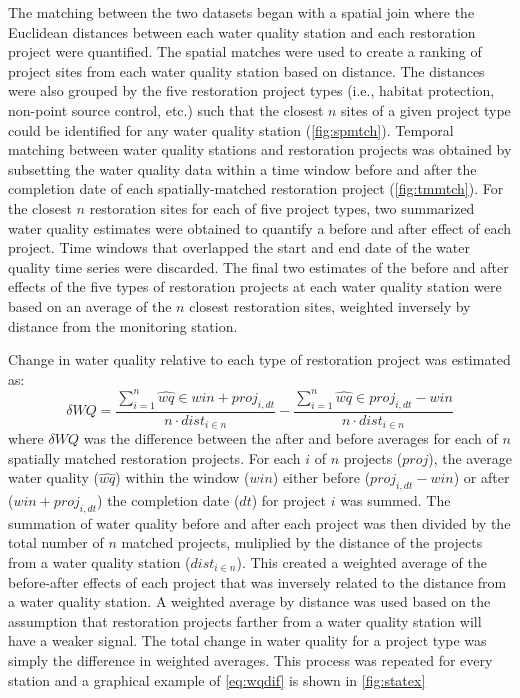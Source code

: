 \documentclass[]{article}
\begin{document}
The matching between the two datasets began with a spatial join where
the Euclidean distances between each water quality station and each
restoration project were quantified. The spatial matches were used to
create a ranking of project sites from each water quality station based
on distance. The distances were also grouped by the five restoration
project types (i.e., habitat protection, non-point source control, etc.)
such that the closest \(n\) sites of a given project type could be
identified for any water quality station (\cref{fig:spmtch}). Temporal
matching between water quality stations and restoration projects was
obtained by subsetting the water quality data within a time window
before and after the completion date of each spatially-matched
restoration project (\cref{fig:tmmtch}). For the closest \(n\)
restoration sites for each of five project types, two summarized water
quality estimates were obtained to quantify a before and after effect of
each project. Time windows that overlapped the start and end date of the
water quality time series were discarded. The final two estimates of the
before and after effects of the five types of restoration projects at
each water quality station were based on an average of the \(n\) closest
restoration sites, weighted inversely by distance from the monitoring
station.

Change in water quality relative to each type of restoration project was
estimated as: \begin{equation}
\delta WQ = \frac{\sum_{i = 1}^{n} \hat{wq} \in win + proj_{i, dt}}{n \cdot dist_{i \in n}} - \frac{\sum_{i = 1}^{n} \hat{wq} \in proj_{i, dt} - win}{n \cdot dist_{i \in n}}
\label{eq:wqdif}
\end{equation} where \(\delta WQ\) was the difference between the after
and before averages for each of \(n\) spatially matched restoration
projects. For each \(i\) of \(n\) projects (\(proj\)), the average water
quality (\(\hat{wq}\)) within the window (\(win\)) either before
(\(proj_{i, dt} - win\)) or after (\(win + proj_{i, dt}\)) the
completion date (\(dt\)) for project \(i\) was summed. The summation of
water quality before and after each project was then divided by the
total number of \(n\) matched projects, muliplied by the distance of the
projects from a water quality station (\(dist_{i \in n}\)). This created
a weighted average of the before-after effects of each project that was
inversely related to the distance from a water quality station. A
weighted average by distance was used based on the assumption that
restoration projects farther from a water quality station will have a
weaker signal. The total change in water quality for a project type was
simply the difference in weighted averages. This process was repeated
for every station and a graphical example of \cref{eq:wqdif} is shown in
\cref{fig:statex}
\end{document}
